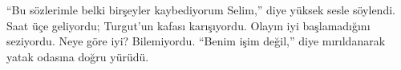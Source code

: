 \documentclass[a5paper,13pt]{scrbook}
\begin{document}
``Bu sözlerimle belki birşeyler kaybediyorum Selim,'' diye yüksek sesle söylendi.
Saat üçe geliyordu; Turgut'un kafası karışıyordu. Olayın iyi başlamadığını
seziyordu. Neye göre iyi? Bilemiyordu. ``Benim işim değil,'' diye mırıldanarak
yatak odasına doğru yürüdü.

\section*{}
\end{document}
